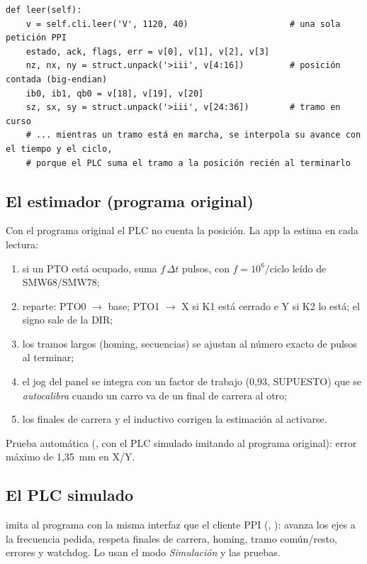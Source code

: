 \begin{lstlisting}[style=py, caption={Lectura del estado con el perfil \emph{gemelo} (\texttt{brazo.py}, fragmento).}]
def leer(self):
    v = self.cli.leer('V', 1120, 40)                    # una sola petición PPI
    estado, ack, flags, err = v[0], v[1], v[2], v[3]
    nz, nx, ny = struct.unpack('>iii', v[4:16])         # posición contada (big-endian)
    ib0, ib1, qb0 = v[18], v[19], v[20]
    sz, sx, sy = struct.unpack('>iii', v[24:36])        # tramo en curso
    # ... mientras un tramo está en marcha, se interpola su avance con el tiempo y el ciclo,
    # porque el PLC suma el tramo a la posición recién al terminarlo
\end{lstlisting}

\subsection{El estimador (programa original)}\label{sec:estimador}
Con el programa original el PLC no cuenta la posición. La app la estima en cada lectura:
\begin{enumerate}
\item si un PTO está ocupado, suma $f\,\Delta t$ pulsos, con $f = 10^6/\text{ciclo}$ leído de SMW68/SMW78;
\item reparte: PTO0 $\to$ base; PTO1 $\to$ X si K1 está cerrado e Y si K2 lo está; el signo sale de la DIR;
\item los tramos largos (homing, secuencias) se ajustan al número exacto de pulsos al terminar;
\item el jog del panel se integra con un factor de trabajo (0,93, SUPUESTO) que se \emph{autocalibra} cuando un carro va de un final de carrera al otro;
\item los finales de carrera y el inductivo corrigen la estimación al activarse.
\end{enumerate}
Prueba automática (, con el PLC simulado imitando al programa original): error máximo de 1,35~mm en X/Y.

\subsection{El PLC simulado}
 imita al programa  con la misma interfaz que el cliente PPI (, ): avanza los ejes a la frecuencia pedida, respeta finales de carrera, homing, tramo común/resto, errores y watchdog. Lo usan el modo \emph{Simulación} y las pruebas.

